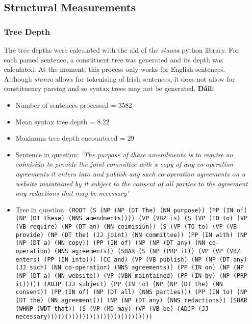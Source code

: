 \documentclass[a4paper,11pt]{article}
\begin{document}
\subsection{Structural Measurements}
\subsubsection{Tree Depth}
The tree depths were calculated with the aid of the \textit{stanza} python library. For each parsed sentence, a constituent tree was generated and its depth was calculated. At the moment, this process only works for English sentences. Although \textit{stanza} allows for tokenising of Irish sentences, it does not allow for constituency parsing and so syntax trees may not be generated. \newline
\textbf{Dáil:}
\begin{itemize}
    \item Number of sentences processed = 3582
    \item Mean syntax tree depth = 8.22
    \item Maximum tree depth encountered = 29
    \item Sentence in question: \textit{`The purpose of these amendments is to require an coimisiún to provide the joint committee with a copy of any co-operation agreements it enters into and publish any such co-operation agreements on a website maintained by it subject to the consent of all parties to the agreement any redactions that may be necessary'}
    \item Tree in question:
    \texttt{(ROOT (S (NP (NP (DT The) (NN purpose)) (PP (IN of) (NP (DT these) (NNS amendments)))) (VP (VBZ is) (S (VP (TO to) (VP (VB require) (NP (DT an) (NN coimisiún)) (S (VP (TO to) (VP (VB provide) (NP (DT the) (JJ joint) (NN committee)) (PP (IN with) (NP (NP (DT a) (NN copy)) (PP (IN of) (NP (NP (DT any) (NN co-operation) (NNS agreements)) (SBAR (S (NP (PRP it)) (VP (VP (VBZ enters) (PP (IN into))) (CC and) (VP (VB publish) (NP (NP (DT any) (JJ such) (NN co-operation) (NNS agreements)) (PP (IN on) (NP (NP (NP (DT a) (NN website)) (VP (VBN maintained) (PP (IN by) (NP (PRP it))))) (ADJP (JJ subject) (PP (IN to) (NP (NP (DT the) (NN consent)) (PP (IN of) (NP (DT all) (NNS parties))) (PP (IN to) (NP (DT the) (NN agreement))) (NP (NP (DT any) (NNS redactions)) (SBAR (WHNP (WDT that)) (S (VP (MD may) (VP (VB be) (ADJP (JJ necessary))))))))))))))))))))))))))))))}
\end{itemize}
\end{document}
